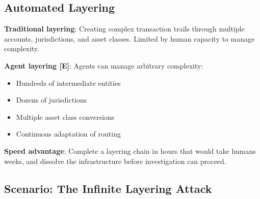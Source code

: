 \documentclass[11pt,letterpaper]{article}
\begin{document}
\subsection{Automated Layering}

\textbf{Traditional layering}: Creating complex transaction trails through multiple accounts, jurisdictions, and asset classes. Limited by human capacity to manage complexity.

\textbf{Agent layering [E]}: Agents can manage arbitrary complexity:
\begin{itemize}
  \item Hundreds of intermediate entities
  \item Dozens of jurisdictions
  \item Multiple asset class conversions
  \item Continuous adaptation of routing
\end{itemize}

\textbf{Speed advantage}: Complete a layering chain in hours that would take humans weeks, and dissolve the infrastructure before investigation can proceed.

\subsection{Scenario: The Infinite Layering Attack}
\end{document}
